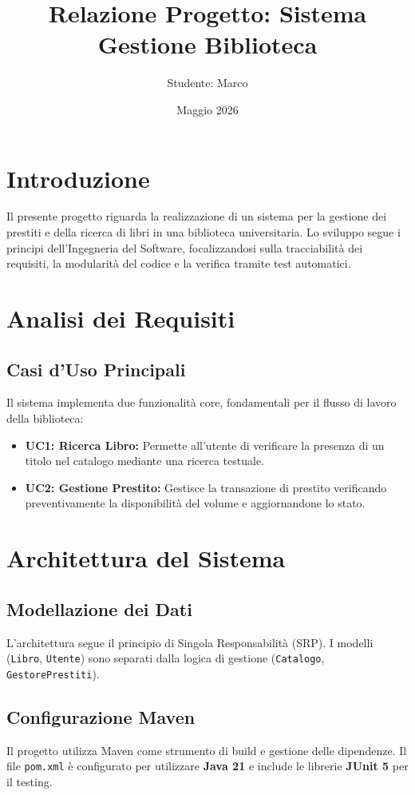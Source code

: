 \documentclass[12pt, a4paper]{article}
\title{Relazione Progetto: Sistema Gestione Biblioteca}
\author{Studente: Marco}
\date{Maggio 2026}
\begin{document}
\maketitle

\tableofcontents
\newpage

\section{Introduzione}
Il presente progetto riguarda la realizzazione di un sistema per la gestione dei prestiti e della ricerca di libri in una biblioteca universitaria. Lo sviluppo segue i principi dell'Ingegneria del Software, focalizzandosi sulla tracciabilità dei requisiti, la modularità del codice e la verifica tramite test automatici.

\section{Analisi dei Requisiti}
\subsection{Casi d'Uso Principali}
Il sistema implementa due funzionalità core, fondamentali per il flusso di lavoro della biblioteca:
\begin{itemize}
    \item \textbf{UC1: Ricerca Libro:} Permette all'utente di verificare la presenza di un titolo nel catalogo mediante una ricerca testuale.
    \item \textbf{UC2: Gestione Prestito:} Gestisce la transazione di prestito verificando preventivamente la disponibilità del volume e aggiornandone lo stato.
\end{itemize}

\section{Architettura del Sistema}
\subsection{Modellazione dei Dati}
L'architettura segue il principio di Singola Responsabilità (SRP). I modelli (\texttt{Libro}, \texttt{Utente}) sono separati dalla logica di gestione (\texttt{Catalogo}, \texttt{GestorePrestiti}).

\subsection{Configurazione Maven}
Il progetto utilizza Maven come strumento di build e gestione delle dipendenze. Il file \texttt{pom.xml} è configurato per utilizzare \textbf{Java 21} e include le librerie \textbf{JUnit 5} per il testing.
\end{document}
